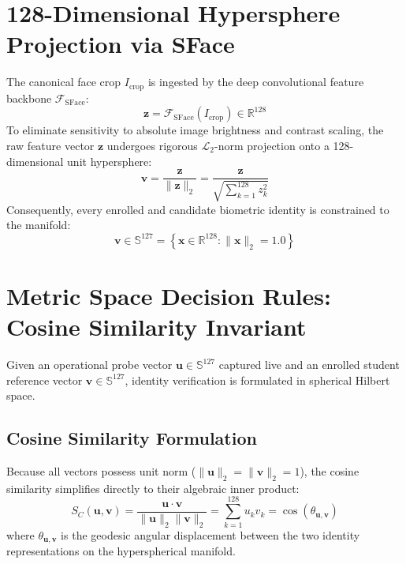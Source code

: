 \section{128-Dimensional Hypersphere Projection via SFace}
The canonical face crop $I_{\text{crop}}$ is ingested by the deep convolutional feature backbone $\mathcal{F}_{\text{SFace}}$:
\begin{equation}
\mathbf{z} = \mathcal{F}_{\text{SFace}}(I_{\text{crop}}) \in \mathbb{R}^{128}
\end{equation}
To eliminate sensitivity to absolute image brightness and contrast scaling, the raw feature vector $\mathbf{z}$ undergoes rigorous $\mathcal{L}_2$-norm projection onto a 128-dimensional unit hypersphere:
\begin{equation}
\mathbf{v} = \frac{\mathbf{z}}{\|\mathbf{z}\|_2} = \frac{\mathbf{z}}{\sqrt{\sum_{k=1}^{128} z_k^2}}
\end{equation}
Consequently, every enrolled and candidate biometric identity is constrained to the manifold:
\begin{equation}
\mathbf{v} \in \mathbb{S}^{127} = \left\{ \mathbf{x} \in \mathbb{R}^{128} : \|\mathbf{x}\|_2 = 1.0 \right\}
\end{equation}

\section{Metric Space Decision Rules: Cosine Similarity Invariant}
Given an operational probe vector $\mathbf{u} \in \mathbb{S}^{127}$ captured live and an enrolled student reference vector $\mathbf{v} \in \mathbb{S}^{127}$, identity verification is formulated in spherical Hilbert space. 

\subsection{Cosine Similarity Formulation}
Because all vectors possess unit norm ($\|\mathbf{u}\|_2 = \|\mathbf{v}\|_2 = 1$), the cosine similarity simplifies directly to their algebraic inner product:
\begin{equation}
S_C(\mathbf{u}, \mathbf{v}) = \frac{\mathbf{u} \cdot \mathbf{v}}{\|\mathbf{u}\|_2 \|\mathbf{v}\|_2} = \sum_{k=1}^{128} u_k v_k = \cos(\theta_{\mathbf{u}, \mathbf{v}})
\end{equation}
where $\theta_{\mathbf{u}, \mathbf{v}}$ is the geodesic angular displacement between the two identity representations on the hyperspherical manifold.

